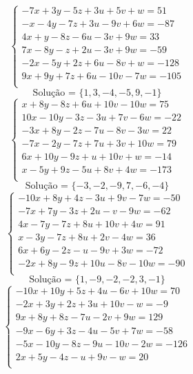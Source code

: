 \documentclass[12pt,oneside,a4paper]{article}
\begin{document}
\vspace{\baselineskip}
\begin{equation*}
\begin{cases}
-7x+3y-5z+3u+5v+w=51 \\
-x-4y-7z+3u-9v+6w=-87 \\
4x+y-8z-6u-3v+9w=33 \\
7x-8y-z+2u-3v+9w=-59 \\
-2x-5y+2z+6u-8v+w=-128 \\
9x+9y+7z+6u-10v-7w=-105 \\
\end{cases}
\end{equation*}
\begin{equation*}
\text{Solução = }\{1,3,-4,-5,9,-1\}
\end{equation*}
\vspace{\baselineskip}
\begin{equation*}
\begin{cases}
x+8y-8z+6u+10v-10w=75 \\
10x-10y-3z-3u+7v-6w=-22 \\
-3x+8y-2z-7u-8v-3w=22 \\
-7x-2y-7z+7u+3v+10w=79 \\
6x+10y-9z+u+10v+w=-14 \\
x-5y+9z-5u+8v+4w=-173 \\
\end{cases}
\end{equation*}
\begin{equation*}
\text{Solução = }\{-3,-2,-9,7,-6,-4\}
\end{equation*}
\vspace{\baselineskip}
\begin{equation*}
\begin{cases}
-10x+8y+4z-3u+9v-7w=-50 \\
-7x+7y-3z+2u-v-9w=-62 \\
4x-7y-7z+8u+10v+4w=91 \\
x-3y-7z+8u+2v-4w=36 \\
6x+6y-2z-u-9v+3w=-72 \\
-2x+8y-9z+10u-8v-10w=-90 \\
\end{cases}
\end{equation*}
\begin{equation*}
\text{Solução = }\{1,-9,-2,-2,3,-1\}
\end{equation*}
\vspace{\baselineskip}
\begin{equation*}
\begin{cases}
-10x+10y+5z+4u-6v+10w=70 \\
-2x+3y+2z+3u+10v-w=-9 \\
9x+8y+8z-7u-2v+9w=129 \\
-9x-6y+3z-4u-5v+7w=-58 \\
-5x-10y-8z-9u-10v-2w=-126 \\
2x+5y-4z-u+9v-w=20 \\
\end{cases}
\end{equation*}
\end{document}
